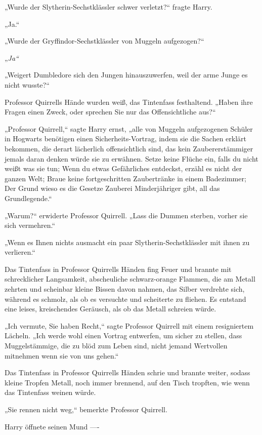 {„Wurde der Slytherin-Sechstklässler schwer verletzt?“ fragte Harry.

„Ja.“

„Wurde der Gryffindor-Sechstklässler von Muggeln aufgezogen?“

„\emph{Ja“}

„Weigert Dumbledore sich den Jungen hinauszuwerfen, weil der arme Junge es nicht wusste?“

Professor Quirrells Hände wurden weiß, das Tintenfass festhaltend. „Haben ihre Fragen einen Zweck, oder sprechen Sie nur das Offensichtliche aus?“

„Professor Quirrell,“ sagte Harry ernst, „alle von Muggeln aufgezogenen Schüler in Hogwarts benötigen einen Sicherheits-Vortrag, indem sie die Sachen erklärt bekommen, die derart lächerlich offensichtlich sind, das kein Zaubererstämmiger jemals daran denken würde sie zu erwähnen. Setze keine Flüche ein, falls du nicht weißt was sie tun; Wenn du etwas Gefährliches entdeckst, erzähl es nicht der ganzen Welt; Braue keine fortgeschritten Zaubertränke in einem Badezimmer; Der Grund wieso es die Gesetze Zauberei Minderjähriger gibt, all das Grundlegende.“

„Warum?“ erwiderte Professor Quirrell. „Lass die Dummen sterben, vorher sie sich vermehren.“

„Wenn es Ihnen nichts ausmacht ein paar Slytherin-Sechstklässler mit ihnen zu verlieren.“

Das Tintenfass in Professor Quirrells Händen fing Feuer und brannte mit schrecklicher Langsamkeit, abscheuliche schwarz-orange Flammen, die am Metall zehrten und scheinbar kleine Bissen davon nahmen, das Silber verdrehte sich, während es schmolz, als ob es versuchte und scheiterte zu fliehen. Es entstand eine leises, kreischendes Geräusch, als ob das Metall schreien würde.

„Ich vermute, Sie haben Recht,“ sagte Professor Quirrell mit einem resigniertem Lächeln. „Ich werde wohl einen Vortrag entwerfen, um sicher zu stellen, dass Muggelstämmige, die zu blöd zum Leben sind, nicht jemand Wertvollen mitnehmen wenn sie von uns gehen.“

Das Tintenfass in Professor Quirrells Händen schrie und brannte weiter, sodass kleine Tropfen Metall, noch immer brennend, auf den Tisch tropften, wie wenn das Tintenfass weinen würde.

„Sie rennen nicht weg,“ bemerkte Professor Quirrell.

Harry öffnete seinen Mund ----

}
